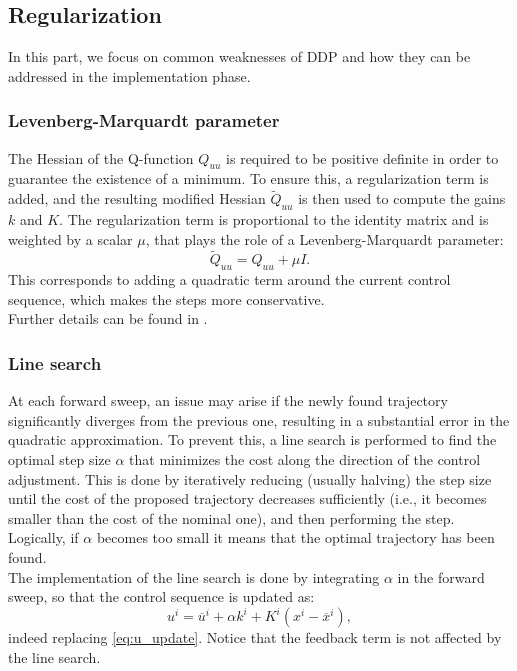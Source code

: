 \subsection{Regularization}
In this part, we focus on common weaknesses of DDP and how they can be addressed in the implementation phase.

\subsubsection{Levenberg-Marquardt parameter}
The Hessian of the Q-function $Q_{uu}$ is required to be positive definite in order to guarantee the existence of a minimum. To ensure this, a regularization term is added, and the resulting modified Hessian $\tilde{Q}_{uu}$ is then used to compute the gains $k$ and $K$. The regularization term is proportional to the identity matrix and is weighted by a scalar $\mu$, that plays the role of a Levenberg-Marquardt parameter:
\begin{equation}
    \tilde{Q}_{uu} = Q_{uu} + \mu I. \label{eq:q_uu_reg}
\end{equation}
This corresponds to adding a quadratic term around the current control sequence, which makes the steps more conservative. \\
Further details can be found in \cite{tassa12}.

\subsubsection{Line search}
At each forward sweep, an issue may arise if the newly found trajectory significantly diverges from the previous one, resulting in a substantial error in the quadratic approximation. To prevent this, a line search is performed to find the optimal step size $\alpha$ that minimizes the cost along the direction of the control adjustment. This is done by iteratively reducing (usually halving) the step size until the cost of the proposed trajectory decreases sufficiently (i.e., it becomes smaller than the cost of the nominal one), and then performing the step. Logically, if $\alpha$ becomes too small it means that the optimal trajectory has been found.\\
The implementation of the line search is done by integrating $\alpha$ in the forward sweep, so that the control sequence is updated as:
\begin{equation}
    u^i = \overline{u}^i + \alpha k^i + K^i (x^i - \overline{x}^i), \label{eq:u_update_alpha}
\end{equation}
indeed replacing \ref{eq:u_update}. Notice that the feedback term is not affected by the line search.
